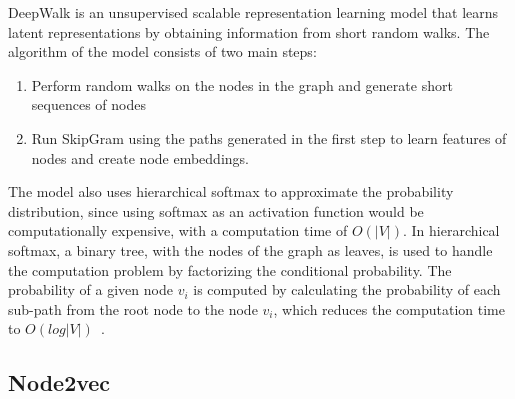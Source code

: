 DeepWalk is an unsupervised scalable representation learning model that learns latent representations by obtaining information from short random walks.
The algorithm of the model consists of two main steps:
\begin{enumerate}[1.]
    \item Perform random walks on the nodes in the graph and generate short sequences of nodes
    \item Run SkipGram using the paths generated in the first step to learn features of nodes and create node embeddings.
\end{enumerate}
The model also uses hierarchical softmax to approximate the probability distribution, since using softmax as an activation function would be computationally expensive, with a computation time of $O(|V|)$.
In hierarchical softmax, a binary tree, with the nodes of the graph as leaves, is used to handle the computation problem by factorizing the conditional probability.
The probability of a given node $v_{i}$ is computed by calculating the probability of each sub-path from the root node to the node $v_{i}$, which reduces the computation time to $O(log|V|)$~\cite{perozzi_deepwalk:_2014}.

\begin{figure}[h!]
\end{figure}

\subsection{Node2vec}\label{subsection:node2vec}

